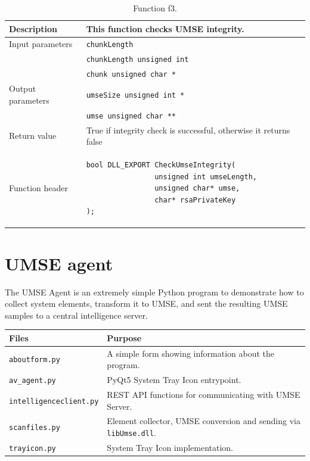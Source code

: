 \begin{table}
  \centering
  \begin{tabular}{|l|p{}|} \hline
    Description	& This function checks UMSE integrity.  \\ \hline
    Input parameters &	\texttt{chunkLength} \\
                & \texttt{chunkLength unsigned int} \\
                & \texttt{chunk unsigned char *} \\ \hline
    Output parameters & \texttt{umseSize unsigned int *} \\
                      & \texttt{umse unsigned char **} \\ \hline
    Return value & True if integrity check is successful, otherwise it returns
    false \\ \hline
    Function header	&
\begin{verbatim}
bool DLL_EXPORT CheckUmseIntegrity(
                unsigned int umseLength,
                unsigned char* umse,
                char* rsaPrivateKey
);
\end{verbatim}
    \\ \hline
  \end{tabular}
  \caption{\label{fig:f3} Function f3.}
\end{table}

\section{UMSE agent}

The UMSE Agent is an extremely simple Python program to demonstrate how to
collect system elements, transform it to UMSE, and sent the resulting UMSE
samples to a central intelligence server.
\begin{table}[h]
  \centering
  \begin{tabular}{|l|p{}|} \hline
    Files & Purpose \\ \hline
    \texttt{aboutform.py} & A simple form showing information about the
                            program. \\ \hline
    \texttt{av\_agent.py} & PyQt5 System Tray Icon entrypoint. \\ \hline
    \texttt{intelligenceclient.py} & REST API functions for communicating with
                                     UMSE Server. \\ \hline
    \texttt{scanfiles.py} & Element collector, UMSE conversion and sending via
                            \texttt{libUmse.dll}. \\ \hline
    \texttt{trayicon.py} & System Tray Icon implementation. \\ \hline
  \end{tabular}
\end{table}

